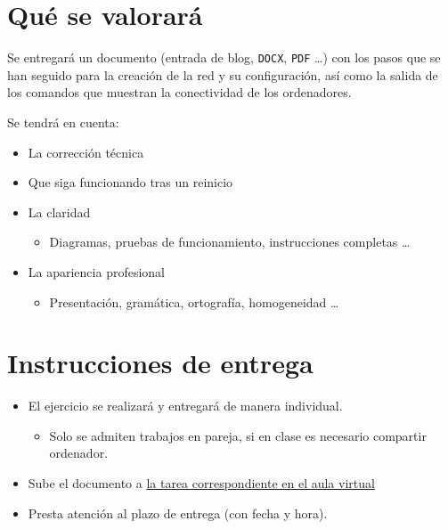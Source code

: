 \documentclass[a4paper]{article}
\begin{document}
\section{Qué se valorará}
\label{sec:org000000f}
Se entregará un documento (entrada de blog, \texttt{DOCX}, \texttt{PDF} \ldots) con los pasos que se han seguido para la creación de la red y su configuración, así como la salida de los comandos que muestran la conectividad de los ordenadores.

Se tendrá en cuenta:
\begin{itemize}
\item La corrección técnica
\item Que siga funcionando tras un reinicio
\item La claridad
\begin{itemize}
\item Diagramas, pruebas de funcionamiento, instrucciones completas \ldots
\end{itemize}
\item La apariencia profesional
\begin{itemize}
\item Presentación, gramática, ortografía, homogeneidad \ldots
\end{itemize}
\end{itemize}



\section{Instrucciones de entrega}
\label{sec:org0000012}
\begin{itemize}
\item El ejercicio se realizará y entregará de manera
individual.
\begin{itemize}
\item Solo se admiten trabajos en pareja, si en clase es necesario compartir ordenador.
\end{itemize}
\item Sube el documento a \href{https://aulavirtual3.educa.madrid.org/ies.alonsodeavellan.alcala/course/view.php?id=189}{la tarea correspondiente en el aula virtual}
\item Presta atención al plazo de entrega (con fecha y hora).
\end{itemize}
\end{document}
